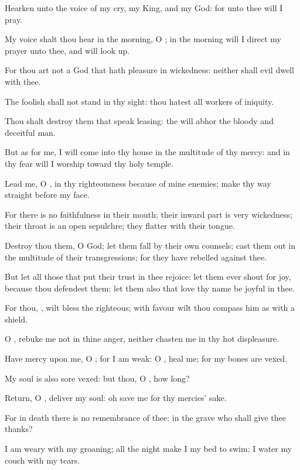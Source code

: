 \Verse Hearken unto the voice of my cry, my King, and my God: for unto thee will I pray.

\Verse My voice shalt thou hear in the morning, O \LORD; in the morning will I direct my prayer unto thee, and will look up.

\Verse For thou art not a God that hath pleasure in wickedness: neither shall evil dwell with thee.

\Verse The foolish shall not stand in thy sight: thou hatest all workers of iniquity.

\Verse Thou shalt destroy them that speak leasing: the \LORD will abhor the bloody and deceitful man.

\Verse But as for me, I will come into thy house in the multitude of thy mercy: and in thy fear will I worship toward thy holy temple.

\Verse Lead me, O \LORD, in thy righteousness because of mine enemies; make thy way straight before my face.

\Verse For there is no faithfulness in their mouth; their inward part is very wickedness; their throat is an open sepulchre; they flatter with their tongue.

\Verse Destroy thou them, O God; let them fall by their own counsels; cast them out in the multitude of their transgressions; for they have rebelled against thee.

\Verse But let all those that put their trust in thee rejoice: let them ever shout for joy, because thou defendest them: let them also that love thy name be joyful in thee.

\Verse For thou, \LORD, wilt bless the righteous; with favour wilt thou compass him as with a shield.




\Chapter
\Verse O \LORD, rebuke me not in thine anger, neither chasten me in thy hot displeasure.

\Verse Have mercy upon me, O \LORD; for I am weak: O \LORD, heal me; for my bones are vexed.

\Verse My soul is also sore vexed: but thou, O \LORD, how long?

\Verse Return, O \LORD, deliver my soul: oh save me for thy mercies' sake.

\Verse For in death there is no remembrance of thee: in the grave who shall give thee thanks?

\Verse I am weary with my groaning; all the night make I my bed to swim; I water my couch with my tears.

